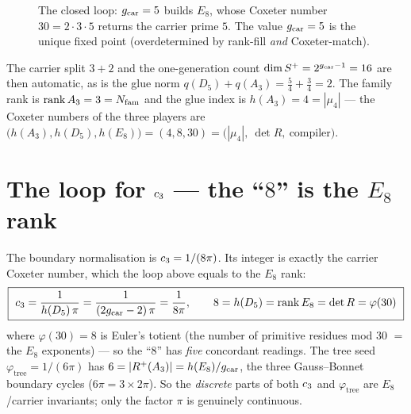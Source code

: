 \begin{figure}[h]\centering
{}
\caption{\small The closed loop: $g_{\mathrm{car}}=5$ builds $E_8$, whose Coxeter number $30=2\cdot3\cdot5$ returns
the carrier prime $5$. The value $g_{\mathrm{car}}=5$ is the unique fixed point (overdetermined by rank-fill
\emph{and} Coxeter-match).}
\end{figure}

\noindent The carrier split $3+2$ and the one-generation count $\dim S^+=2^{g_{\mathrm{car}}-1}=16$ are then
automatic, as is the glue norm $q(D_5)+q(A_3)=\tfrac54+\tfrac34=2$. The family rank is
$\operatorname{rank}A_3=3=N_{\mathrm{fam}}$ and the glue index is $h(A_3)=4=|\mu_4|$ --- the Coxeter numbers of the
three players are $\bigl(h(A_3),h(D_5),h(E_8)\bigr)=(4,8,30)=\bigl(|\mu_4|,\ \det R,\ \text{compiler}\bigr)$.

\section{The loop for $c_3$ --- the ``$8$'' is the $E_8$ rank}
The boundary normalisation is $c_3=1/(8\pi)$. Its integer is exactly the carrier Coxeter number,
which the loop above equals to the $E_8$ rank:
\[
  \boxed{\ \cthree=\frac{1}{h(D_5)\,\pi}=\frac{1}{(2\gcar-2)\,\pi}=\frac{1}{8\pi},\qquad
  8=h(D_5)=\operatorname{rank}E_8=\det R=\varphi(30)\ }
\]
where $\varphi(30)=8$ is Euler's totient (the number of primitive residues mod $30$ $=$ the $E_8$
exponents) --- so the ``$8$'' has \emph{five} concordant readings. The tree seed
$\varphi_{\mathrm{tree}}=1/(6\pi)$ has $6=|R^+(A_3)|=h(E_8)/g_{\mathrm{car}}$, the three Gauss--Bonnet boundary
cycles ($6\pi=3\times2\pi$). So the \emph{discrete} parts of both $c_3$ and $\varphi_{\mathrm{tree}}$
are $E_8$/carrier invariants; only the factor $\pi$ is genuinely continuous.

